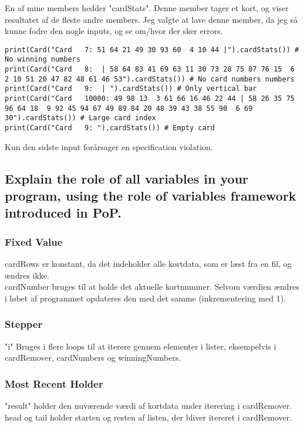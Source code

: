 \documentclass[a4paper,12pt]{article}
\begin{document}
En af mine members hedder "cardStats". Denne member tager et kort, og viser resultatet af de fleste andre members. Jeg valgte at lave denne member, da jeg så kunne fodre den nogle inputs, og se om/hvor der sker errors.
\begin{lstlisting}
print(Card("Card   7: 51 64 21 49 30 93 60  4 10 44 |").cardStats()) # No winning numbers
print(Card("Card   8:  | 58 64 83 41 69 63 11 30 73 28 75 87 76 15  6  2 10 51 20 47 82 48 61 46 53").cardStats()) # No card numbers numbers
print(Card("Card   9:  | ").cardStats()) # Only vertical bar
print(Card("Card   10000: 49 98 13  3 61 66 16 46 22 44 | 58 26 35 75 96 64 18  9 92 45 94 67 49 89 84 20 48 39 43 38 55 90  6 69 30").cardStats()) # Large card index
print(Card("Card   9: ").cardStats()) # Empty card
\end{lstlisting}
Kun den sidste input forårsager en specification violation. 

\subsection[Explain the role of all variables in your program]{Explain the role of all variables in your program, using the role of variables framework introduced in PoP.}

\subsubsection*{Fixed Value}
cardRows er konstant, da det indeholder alle kortdata, som er læst fra en fil, og ændres ikke.\\
cardNumber bruges til at holde det aktuelle kortnummer. Selvom værdien ændres i løbet af programmet opdateres den med det samme (inkrementering med 1).

\subsubsection*{Stepper}
"i" Bruges i flere loops til at iterere gennem elementer i lister, eksempelvis i cardRemover, cardNumbers og winningNumbers.

\subsubsection*{Most Recent Holder}
"result" holder den nuværende værdi af kortdata under iterering i cardRemover.\\
head og tail holder starten og resten af listen, der bliver itereret i cardRemover.
\end{document}
